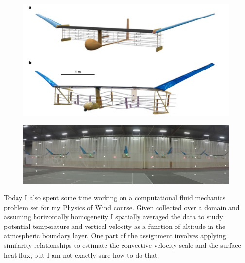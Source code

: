 \documentclass[12pt]{article}
\begin{document}
\begin{figure}[H]
\centering
\includegraphics[width=\linewidth]{images/ionicwindplane.pdf}
\end{figure}

\begin{figure}[H]
\centering
\includegraphics[width=\linewidth]{images/ionocraftmotion.pdf}
\end{figure}

\par
Today I also spent some time working on a computational fluid mechanics problem set for my Physics of Wind course. Given collected over a domain and assuming horizontally homogeneity I spatially averaged the data to study potential temperature and vertical velocity as a function of altitude in the atmospheric boundary layer. One part of the assignment involves applying similarity relationships to estimate the convective velocity scale and the surface heat flux, but I am not exactly sure how to do that. 
\end{document}
